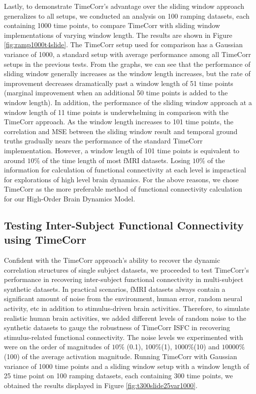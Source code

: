 \documentclass[11pt]{article}
\begin{document}
Lastly, to demonstrate TimeCorr's advantage over the sliding window approach generalizes to all setups, we conducted an analysis on 100 ramping datasets, each containing 1000 time points, to compare TimeCorr with sliding window implementations of varying window length. The results are shown in Figure \ref{fig:ramp1000t4slide}. The TimeCorr setup used for comparison has a Gaussian variance of 1000, a standard setup with average performance among all TimeCorr setups in the previous tests. From the graphs, we can see that the performance of sliding window generally increases as the window length increases, but the rate of improvement decreases dramatically past a window length of 51 time points (marginal improvement when an additional 50 time points is added to the window length). In addition, the performance of the sliding window approach at a window length of 11 time points is underwhelming in comparison with the TimeCorr approach. As the window length increases to 101 time points, the correlation and MSE between the sliding window result and temporal ground truths gradually nears the performance of the standard TimeCorr implementation. However, a window length of 101 time points is equivalent to around $10\%$ of the time length of most fMRI datasets. Losing $10\%$ of the information for calculation of functional connectivity at each level is impractical for explorations of high level brain dynamics. For the above reasons, we chose TimeCorr as the more preferable method of functional connectivity calculation for our High-Order Brain Dynamics Model.


\subsection{Testing Inter-Subject Functional Connectivity using TimeCorr}
Confident with the TimeCorr approach's ability to recover the dynamic correlation structures of single subject datasets, we proceeded to test TimeCorr's performance in recovering inter-subject functional connectivity in multi-subject synthetic datasets. In practical scenarios, fMRI datasets always contain a significant amount of noise from the environment, human error, random neural activity, etc in addition to stimulus-driven brain activities. Therefore, to simulate realistic human brain activities, we added different levels of random noise to the synthetic datasets to gauge the robustness of TimeCorr ISFC in recovering stimulus-related functional connectivity. The noise levels we experimented with were on the order of magnitudes of $10\%$ (0.1), $100\%$(1), $1000\%$(10) and $10000\%$(100) of the average activation magnitude. Running TimeCorr with Gaussian variance of 1000 time points and a sliding window setup with a window length of 25 time point on 100 ramping datasets, each containing 300 time points, we obtained the results displayed in Figure \ref{fig:t300slide25var1000}.
\end{document}
